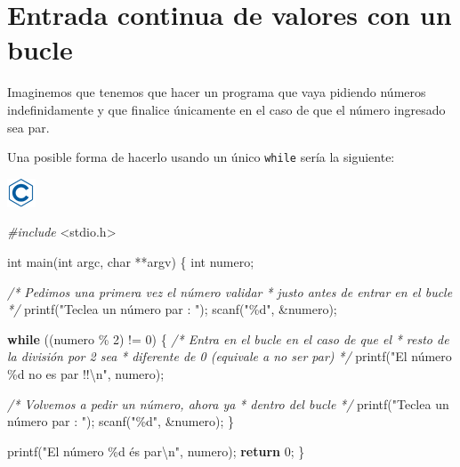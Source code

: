 \documentclass[
]{book}
\newenvironment{Shaded}{\begin{snugshade}}{\end{snugshade}}
\newcommand{\CommentTok}[1]{\textcolor[rgb]{0.56,0.35,0.01}{\textit{#1}}}
\newcommand{\ControlFlowTok}[1]{\textcolor[rgb]{0.13,0.29,0.53}{\textbf{#1}}}
\newcommand{\DataTypeTok}[1]{\textcolor[rgb]{0.13,0.29,0.53}{#1}}
\newcommand{\DecValTok}[1]{\textcolor[rgb]{0.00,0.00,0.81}{#1}}
\newcommand{\ImportTok}[1]{#1}
\newcommand{\NormalTok}[1]{#1}
\newcommand{\PreprocessorTok}[1]{\textcolor[rgb]{0.56,0.35,0.01}{\textit{#1}}}
\newcommand{\SpecialCharTok}[1]{\textcolor[rgb]{0.00,0.00,0.00}{#1}}
\newcommand{\StringTok}[1]{\textcolor[rgb]{0.31,0.60,0.02}{#1}}
\begin{document}
\hypertarget{entrada-continua-de-valores-con-un-bucle}{%
\section{Entrada continua de valores con un bucle}\label{entrada-continua-de-valores-con-un-bucle}}

Imaginemos que tenemos que hacer un programa que vaya pidiendo números indefinidamente y que finalice únicamente en el caso de que el número ingresado sea par.

Una posible forma de hacerlo usando un único \texttt{while} sería la siguiente:

\includegraphics{./img/c.png}

\begin{Shaded}
\begin{Highlighting}[]
\PreprocessorTok{\#include }\ImportTok{\textless{}stdio.h\textgreater{}}

\DataTypeTok{int}\NormalTok{ main(}\DataTypeTok{int}\NormalTok{ argc, }\DataTypeTok{char}\NormalTok{ **argv) \{}
    \DataTypeTok{int}\NormalTok{ numero;}

    \CommentTok{/* Pedimos una primera vez el número validar}
\CommentTok{     * justo antes de entrar en el bucle}
\CommentTok{     */}
\NormalTok{    printf(}\StringTok{"Teclea un número par : "}\NormalTok{);}
\NormalTok{    scanf(}\StringTok{"\%d"}\NormalTok{, \&numero);}

    \ControlFlowTok{while}\NormalTok{ ((numero \% }\DecValTok{2}\NormalTok{) != }\DecValTok{0}\NormalTok{) \{}
        \CommentTok{/* Entra en el bucle en el caso de que el}
\CommentTok{         * resto de la división por 2 sea}
\CommentTok{         * diferente de 0 (equivale a no ser par)}
\CommentTok{         */}
\NormalTok{        printf(}\StringTok{"El número \%d no es par !!}\SpecialCharTok{\textbackslash{}n}\StringTok{"}\NormalTok{, numero);}
 
        \CommentTok{/* Volvemos a pedir un número, ahora ya}
\CommentTok{         * dentro del bucle}
\CommentTok{         */}
\NormalTok{        printf(}\StringTok{"Teclea un número par : "}\NormalTok{);}
\NormalTok{        scanf(}\StringTok{"\%d"}\NormalTok{, \&numero);}
\NormalTok{    \}}

\NormalTok{    printf(}\StringTok{"El número \%d és par}\SpecialCharTok{\textbackslash{}n}\StringTok{"}\NormalTok{, numero);}
    \ControlFlowTok{return} \DecValTok{0}\NormalTok{;}
\NormalTok{\}}
\end{Highlighting}
\end{Shaded}
\end{document}

